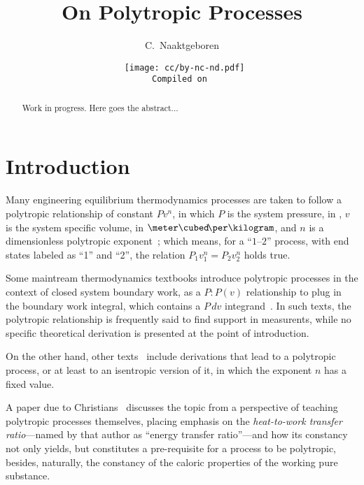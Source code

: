 \documentclass[10pt,a4paper]{article}
\title{On Polytropic Processes}
\author[1]{C.~Naaktgeboren}
\affil[1]{%
    Universidade Tecnológica Federal do Paraná -- UTFPR, Câmpus Guarapuava.\par
    Grupo de Pesquisa em Ciências Térmicas.
}
\date{{\scriptsize\tt%
    \texttt{[image: cc/by-nc-nd.pdf]}\\
    Compiled on 
}}
\begin{document}

\maketitle

\begin{abstract}
    Work in progress.
    Here goes the abstract...
\end{abstract}

\section{Introduction}

    Many engineering equilibrium thermodynamics processes  are  taken  to  follow  a  polytropic
    relationship of constant $Pv^n$, in which $P$ is the system pressure, in  \kilo\pascal,  $v$
    is the system specific volume, in $\meter\cubed\!\per\kilogram$, and $n$ is a  dimensionless
    polytropic  exponent~\cite{2013-CengelYA+BolesMA-AMGH};  which  means,  for  a  ``$1$--$2$''
    process, with end states labeled as ``1'' and ``2'',  the  relation  $P_1v_1^n  =  P_2v_2^n$
    holds true.

    Some maintream thermodynamics textbooks introduce polytropic processes  in  the  context  of
    closed system boundary work, as a  $P:P(v)$  relationship  to  plug  in  the  boundary  work
    integral,   which    contains    a    $P\,dv$    integrand~\cite{2013-CengelYA+BolesMA-AMGH,
    2002-MoranMJ+ShapiroHN-LTC, 1985-WylenG-Wiley}. In such texts, the  polytropic  relationship
    is frequently said to find support in measurents, while no specific  theoretical  derivation
    is presented at the point of introduction.

    On  the  other  hand,  other  texts~\cite{1986-JonesJB+HawkingsGA-Wiley,  2006-BejanA-Wiley,
    2015-KroosKA+PotterMC-Cengage} include derivations that lead to a polytropic process, or  at
    least to an isentropic version of it, in which the exponent $n$ has a fixed value.

    A paper due to Christians~\cite{2012-ChristiansJ-IntJMechEngEduc} discusses the topic from a
    perspective  of  teaching  polytropic  processes  themselves,  placing   emphasis   on   the
    \emph{heat-to-work transfer ratio}---named by that author as ``energy transfer ratio''---and
    how its constancy not only yields, but constitutes a  pre-requisite  for  a  process  to  be
    polytropic, besides, naturally, the constancy of the caloric properties of the working  pure
    substance.
\end{document}
